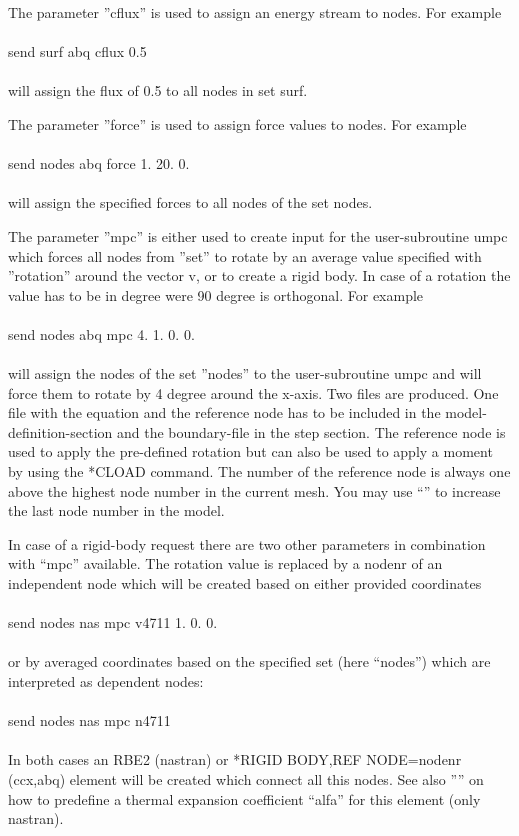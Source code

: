 \documentclass{article}
\begin{document}
The parameter ''cflux'' is used to assign an energy stream to nodes. For example\\\\send surf abq cflux 0.5\\\\will assign the flux of 0.5 to all nodes in set surf.

The parameter ''force'' is used to assign force values to nodes. For example\\\\send nodes abq force 1. 20. 0.\\\\will assign the specified forces to all nodes of the set nodes.

The parameter ''mpc'' is either used to create input for the user-subroutine umpc which forces all nodes from ''set'' to rotate by an average value specified with ''rotation'' around the vector v, or to create a rigid body. In case of a rotation the value has to be in degree were 90 degree is orthogonal. For example\\\\send nodes abq mpc 4. 1. 0. 0.\\\\will assign the nodes of the set ''nodes'' to the user-subroutine umpc and will force them to rotate by 4 degree around the x-axis. Two files are produced. One file with the equation and the reference node has to be included in the model-definition-section and the boundary-file in the step section. The reference node is used to apply the pre-defined rotation but can also be used to apply a moment by using the *CLOAD command. The number of the reference node is always one above the highest node number in the current mesh. You may use ``'' to increase the last node number in the model.

In case of a rigid-body request there are two other parameters in combination with ``mpc'' available. The rotation value is replaced by a nodenr of an independent node which will be created based on either provided coordinates\\\\send nodes nas mpc v4711 1. 0. 0.\\\\or by averaged coordinates based on the specified set (here ``nodes'') which are interpreted as dependent nodes:\\\\send nodes nas mpc n4711\\\\In both cases an RBE2 (nastran) or *RIGID BODY,REF NODE=nodenr (ccx,abq) element will be created which connect all this nodes. See also '''' on how to predefine a thermal expansion coefficient ``alfa'' for this element (only nastran).\\\\
\end{document}
